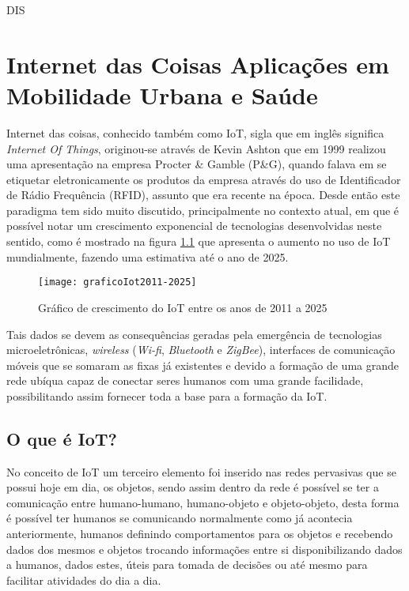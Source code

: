DIS\chapter{Internet das Coisas Aplicações em Mobilidade Urbana e Saúde}
\label{chap:cap1}
Internet das coisas, conhecido também como IoT, sigla que em inglês significa \textit{Internet Of Things}, originou-se através de Kevin Ashton que em 1999 realizou uma apresentação na empresa  Procter \& Gamble (P\&G), quando falava em se etiquetar eletronicamente os produtos da empresa através do uso de Identificador de Rádio Frequência (RFID), assunto que era recente na época. Desde então este paradigma tem sido muito discutido, principalmente no contexto atual, em que é possível notar um crescimento exponencial de tecnologias desenvolvidas neste sentido, como é mostrado na figura \ref{fig:graficoIot2011-2025} que apresenta o aumento no uso de IoT mundialmente, fazendo uma estimativa até o ano de 2025.\cite{historiaiot} 

\begin{figure}[htb]
\caption{\label{fig:graficoIot2011-2025}Gráfico de crescimento do IoT entre os anos de 2011 a 2025}
\begin{center}
\texttt{[image: graficoIot2011-2025]}
\end{center}
\end{figure}

Tais dados se devem as consequências geradas pela emergência de tecnologias microeletrônicas, \textit{wireless} (\textit{Wi-fi}, \textit{Bluetooth} e \textit{ZigBee}), interfaces de comunicação móveis que se somaram as fixas já existentes e devido a formação de uma grande rede ubíqua capaz de conectar seres humanos com uma grande facilidade, possibilitando assim fornecer toda a base para a formação da IoT. \cite{santaella2013} 

\section{O que é IoT?}
\label{sec:oqueeiot}
No conceito de IoT um terceiro elemento foi inserido nas redes pervasivas que se possui hoje em dia, os objetos, sendo assim dentro da rede é possível se ter a comunicação entre humano-humano, humano-objeto e objeto-objeto, desta forma é possível ter humanos se comunicando normalmente como já acontecia anteriormente, humanos definindo comportamentos para os objetos e recebendo dados dos mesmos e objetos trocando informações entre si disponibilizando dados a humanos, dados estes, úteis para tomada de decisões ou até mesmo para facilitar atividades do dia a dia.\cite{santaella2013}

